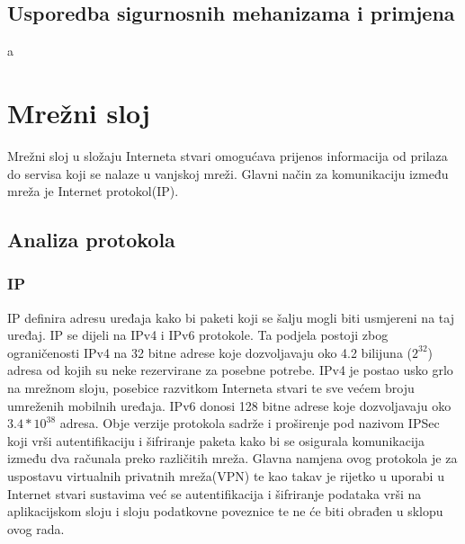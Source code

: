 \documentclass[times, utf8, diplomski]{fer}
\begin{document}
\subsection{Usporedba sigurnosnih mehanizama i primjena}
a

\section{Mrežni sloj}
Mrežni sloj u složaju Interneta stvari omogućava prijenos informacija od prilaza do servisa koji se nalaze u vanjskoj mreži. Glavni način za komunikaciju između mreža je Internet protokol(IP). 

\subsection{Analiza protokola}
\subsubsection{IP}
IP definira adresu uređaja kako bi paketi koji se šalju mogli biti usmjereni na taj uređaj. IP se dijeli na IPv4 i IPv6 protokole. Ta podjela postoji zbog ograničenosti IPv4 na 32 bitne adrese koje dozvoljavaju oko 4.2 bilijuna ($2^{32}$) adresa od kojih su neke rezervirane za posebne potrebe. IPv4 je postao usko grlo na mrežnom sloju, posebice razvitkom Interneta stvari te sve većem broju umreženih mobilnih uređaja. IPv6 donosi 128 bitne adrese koje dozvoljavaju oko $3.4*10^{38}$ adresa. Obje verzije protokola sadrže i proširenje pod nazivom IPSec  koji vrši autentifikaciju i šifriranje paketa kako bi se osigurala komunikacija između dva računala preko različitih mreža. Glavna namjena ovog protokola je za uspostavu virtualnih privatnih mreža(VPN) te kao takav je rijetko u uporabi u Internet stvari sustavima već se autentifikacija i šifriranje podataka vrši na aplikacijskom sloju i sloju podatkovne poveznice te ne će biti obrađen u sklopu ovog rada. 
\end{document}
